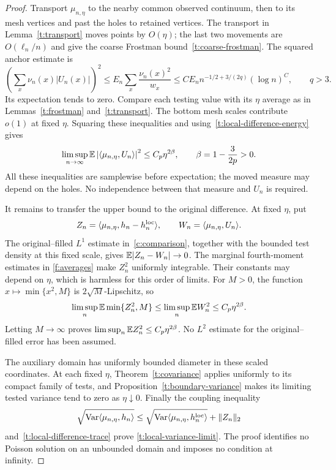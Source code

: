 \begin{proof}
Transport $\mu_{n,\eta}$ to the nearby common observed continuum,
then to its mesh vertices and past the holes to retained vertices.
The transport in Lemma~\ref{t:transport} moves points by $O(\eta)$;
the last two movements are $O(\ell_n/n)$ and give the coarse Frostman
bound~\eqref{t:coarse-frostman}.  The squared anchor estimate is
\[
 \left(\sum_x\nu_n(x)|U_n(x)|\right)^2
 \le E_n\sum_x\frac{\nu_n(x)^2}{w_x}
 \le CE_n n^{-1/2+3/(2q)}(\log n)^C,
 \qquad q>3.
\]
Its expectation tends to zero.  Compare each testing value with its
$\eta$ average as in Lemmas~\ref{t:frostman} and~\ref{t:transport}.
The bottom mesh scales contribute $o(1)$ at fixed $\eta$.  Squaring
these inequalities and using~\eqref{t:local-difference-energy} gives
\begin{equation}\label{t:local-difference-trace}
 \limsup_{n\to\infty}
 \mathbb E\left|\langle\mu_{n,\eta},U_n\rangle\right|^2
 \le C_p\eta^{2\beta},\qquad
 \beta=1-\frac{3}{2p}>0.
\end{equation}
All these inequalities are samplewise before expectation; the moved
measure may depend on the holes.  No independence between that measure
and $U_n$ is required.

It remains to transfer the upper bound to the original difference.
At fixed $\eta$, put
\[
 Z_n=\langle\mu_{n,\eta},h_n-h_n^{\rm loc}\rangle,
 \qquad W_n=\langle\mu_{n,\eta},U_n\rangle.
\]
The original--filled $L^1$ estimate in~\ref{c:comparison}, together
with the bounded test density at this fixed scale, gives
$\mathbb E|Z_n-W_n|\to0$.  The marginal fourth-moment estimates in
\ref{f:averages} make $Z_n^2$ uniformly integrable.  Their constants
may depend on $\eta$, which is harmless for this order of limits.
For $M>0$, the function $x\mapsto\min\{x^2,M\}$ is
$2\sqrt M$-Lipschitz, so
\[
 \limsup_n\mathbb E\min\{Z_n^2,M\}
 \le\limsup_n\mathbb E W_n^2\le C_p\eta^{2\beta}.
\]
Letting $M\to\infty$ proves
$\limsup_n\mathbb E Z_n^2\le C_p\eta^{2\beta}$.  No $L^2$ estimate for the
original--filled error has been assumed.

The auxiliary domain has uniformly bounded diameter in these scaled
coordinates.  At each fixed $\eta$, Theorem~\ref{t:covariance} applies
uniformly to its compact family of tests, and
Proposition~\ref{t:boundary-variance} makes its limiting tested variance
tend to zero as $\eta\downarrow0$.  Finally the coupling inequality
\[
 \sqrt{\operatorname{Var}\langle\mu_{n,\eta},h_n\rangle}
 \le
 \sqrt{\operatorname{Var}\langle\mu_{n,\eta},h_n^{\rm loc}\rangle}
       +\|Z_n\|_2
\]
and~\eqref{t:local-difference-trace} prove
\eqref{t:local-variance-limit}.  The proof identifies no Poisson
solution on an unbounded domain and imposes no condition at infinity.
\end{proof}

